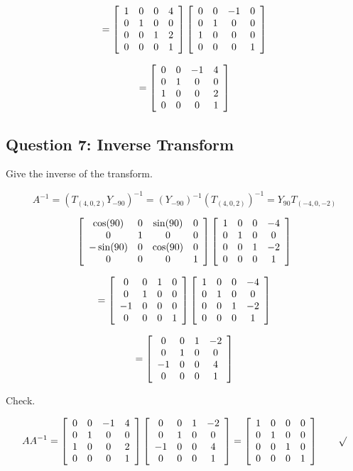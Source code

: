 \documentclass[11pt]{article}
\begin{document}
\begin{spacing}{1.2}
$$= 
\left[
\begin{array}{cccc}
	1 & 0 & 0 & 4 \cr
	0 & 1 & 0 & 0 \cr
	0 & 0 & 1 & 2 \cr
	0 & 0 & 0 & 1 \cr
\end{array}
\right]
\left[
	\begin{array}{cccc}
		0 & 0 & -1 & 0 \cr
		0 & 1 & 0 & 0 \cr
		1 & 0 & 0 & 0 \cr
		0 & 0 & 0 & 1 \cr
	\end{array}
\right]
$$

$$= 
\left[
	\begin{array}{cccc}
		0 & 0 & -1 & 4 \cr
		0 & 1 & 0 & 0 \cr
		1 & 0 & 0 & 2 \cr
		0 & 0 & 0 & 1 \cr
	\end{array}
\right]
$$

\subsection{Question 7:  Inverse Transform}

Give the inverse of the transform.  

$$A^{-1}= \left(T_{(4,0,2)} Y_{-90}\right)^{-1} = 
\left( Y_{-90} \right)^{-1}\left( T_{(4,0,2)}\right)^{-1} = 
Y_{90} T_{(-4,0,-2)}
$$

$$
\left[
	\begin{array}{cccc}
		\cos (90) & 0 & \sin (90) & 0 \cr
		0 & 1 & 0 & 0 \cr
		-\sin(90) & 0 & \cos (90) & 0 \cr
		0 & 0 & 0 & 1 \cr
	\end{array}
\right]
\left[
\begin{array}{cccc}
	1 & 0 & 0 & -4 \cr
	0 & 1 & 0 & 0 \cr
	0 & 0 & 1 & -2 \cr
	0 & 0 & 0 & 1 \cr
\end{array}
\right]
$$

$$= 
\left[
	\begin{array}{cccc}
		0 & 0 & 1 & 0 \cr
		0 & 1 & 0 & 0 \cr
		-1 & 0 & 0 & 0 \cr
		0 & 0 & 0 & 1 \cr
	\end{array}
\right]
\left[
\begin{array}{cccc}
	1 & 0 & 0 & -4 \cr
	0 & 1 & 0 & 0 \cr
	0 & 0 & 1 & -2 \cr
	0 & 0 & 0 & 1 \cr
\end{array}
\right]
$$

$$= 
\left[
	\begin{array}{cccc}
		0 & 0 & 1 & -2 \cr
		0 & 1 & 0 & 0 \cr
		-1 & 0 & 0 & 4 \cr
		0 & 0 & 0 & 1 \cr
	\end{array}
\right]
$$

Check.  

$$ A A^{-1} = \left[
	\begin{array}{cccc}
		0 & 0 & -1 & 4 \cr
		0 & 1 & 0 & 0 \cr
		1 & 0 & 0 & 2 \cr
		0 & 0 & 0 & 1 \cr
	\end{array}
\right]
\left[
	\begin{array}{cccc}
		0 & 0 & 1 & -2 \cr
		0 & 1 & 0 & 0 \cr
		-1 & 0 & 0 & 4 \cr
		0 & 0 & 0 & 1 \cr
	\end{array}
\right]
=
\left[
	\begin{array}{cccc}
		1 & 0 & 0 & 0 \cr
		0 & 1 & 0 & 0 \cr
		0 & 0 & 1 & 0 \cr
		0 & 0 & 0 & 1 \cr
	\end{array}
\right]
\qquad \surd
$$



\end{spacing}
\end{document}
